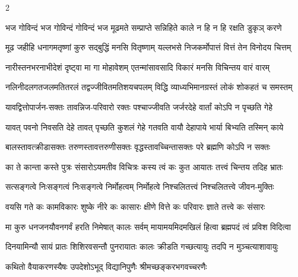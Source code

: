\setlength{\shlokaspaceskip}{6pt}
\setlength{\columnseprule}{0pt}
\setlength{\columnsep}{10pt}
\begin{large}
\begin{multicols}{2}
\begin{flushleft}
\fourlineindentedshloka
{भज गोविन्दं भज गोविन्दं}
{गोविन्दं भज मूढमते}
{सम्प्राप्ते सन्निहिते काले}
{न हि न हि रक्षति डुकृञ् करणे}

\fourlineindentedshloka
{मूढ जहीहि धनागमतृष्णां}
{कुरु सद्बुद्धिं मनसि वितृष्णाम्}
{यल्लभसे निजकर्मोपात्तं}
{वित्तं तेन विनोदय चित्तम्}

\fourlineindentedshloka
{नारीस्तनभरनाभीदेशं}
{दृष्ट्वा मा गा मोहावेशम्}
{एतन्मांसावसादि विकारं}
{मनसि विचिन्तय वारं वारम्}

\fourlineindentedshloka
{नलिनीदलगतजलमतितरलं}
{तद्वज्जीवितमतिशयचपलम्}
{विद्धि व्याध्यभिमानग्रस्तं}
{लोकं शोकहतं च समस्तम्}

\fourlineindentedshloka
{यावद्वित्तोपार्जन-सक्तः}
{तावन्निज-परिवारो रक्तः}
{पश्चाज्जीवति जर्जरदेहे}
{वार्तां कोऽपि न पृच्छति गेहे}

\fourlineindentedshloka
{यावत् पवनो निवसति देहे}
{तावत् पृच्छति कुशलं गेहे}
{गतवति वायौ देहापाये}
{भार्या बिभ्यति तस्मिन् काये}

\fourlineindentedshloka
{बालस्तावत्क्रीडासक्तः}
{तरुणस्तावत्तरुणीसक्तः}
{वृद्धस्तावच्चिन्तासक्तः}
{परे ब्रह्मणि कोऽपि न सक्तः}

\fourlineindentedshloka
{का ते कान्ता कस्ते पुत्रः}
{संसारोऽयमतीव विचित्रः}
{कस्य त्वं कः कुत आयातः}
{तत्त्वं चिन्तय तदिह भ्रातः}

\fourlineindentedshloka
{सत्सङ्गत्वे निःसङ्गत्वं}
{निःसङ्गत्वे निर्मोहत्वम्}
{निर्मोहत्वे निश्चलितत्त्वं}
{निश्चलितत्त्वे जीवन-मुक्तिः}

\fourlineindentedshloka
{वयसि गते कः कामविकारः}
{शुष्के नीरे कः कासारः}
{क्षीणे वित्ते कः परिवारः}
{ज्ञाते तत्त्वे कः संसारः}

\fourlineindentedshloka
{मा कुरु धनजनयौवनगर्वं}
{हरति निमेषात् कालः सर्वम्}
{मायामयमिदमखिलं हित्वा}
{ब्रह्मपदं त्वं प्रविश विदित्वा}

\fourlineindentedshloka
{दिनयामिन्यौ सायं प्रातः}
{शिशिरवसन्तौ पुनरायातः}
{कालः क्रीडति गच्छत्यायुः}
{तदपि न मुञ्चत्याशावायुः}

{कथितो वैयाकरणस्यैषः}
{उपदेशोऽभूद् विद्यानिपुणैः}
{श्रीमच्छङ्करभगवच्चरणैः}


\end{flushleft}
\end{multicols}
\end{large}
